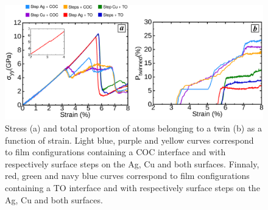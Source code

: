\documentclass[final,3p,times,twocolumn]{elsarticle}
\begin{document}
\begin{figure}[!t]
	\begin{center}
		\includegraphics[width=150mm]{Pic/graph_natstss.eps} 
	\end{center}
	\caption{Stress (a) and total proportion of atoms belonging to a twin (b) as a function of strain. Light blue, purple and yellow curves correspond to film configurations containing a COC interface and with respectively surface steps on the Ag, Cu and both surfaces. Finnaly, red, green and navy blue curves correspond to film configurations containing a TO interface and with respectively surface steps on the Ag, Cu and both surfaces.}\label{graph_stssnat}
\end{figure}
\end{document}

